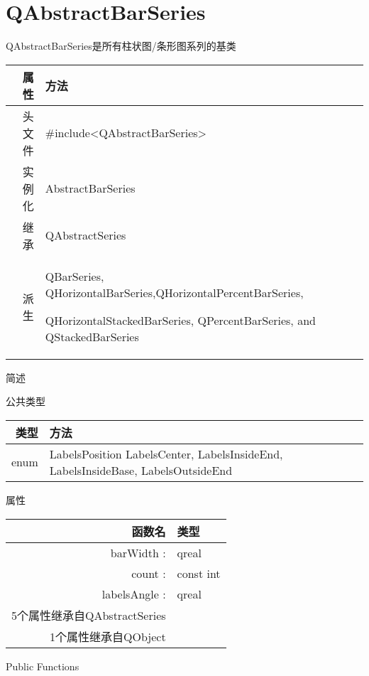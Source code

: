 \chapter{QAbstractBarSeries}

QAbstractBarSeries是所有柱状图/条形图系列的基类

\begin{tabular}{|r|l|}
	\hline
	属性 & 方法 \\
	\hline
	头文件 & \#include<QAbstractBarSeries>\\      
	\hline
	实例化 & AbstractBarSeries\\      
	\hline
	继承&QAbstractSeries \\
	\hline
	派生 & QBarSeries, QHorizontalBarSeries,QHorizontalPercentBarSeries,

 QHorizontalStackedBarSeries, QPercentBarSeries, and QStackedBarSeries \\
	\hline
\end{tabular}

\splitLine

简述

公共类型

\begin{tabular}{|r|l|}
\hline
类型 & 方法 \\
\hline
enum&	LabelsPosition { LabelsCenter, LabelsInsideEnd, LabelsInsideBase, LabelsOutsideEnd }\\
\hline
\end{tabular}

属性

\begin{tabular}{|r|l|}
\hline
函数名 & 类型 \\
\hline
barWidth :	&qreal\\
\hline
count :	&const int\\
\hline
labelsAngle :&qreal\\
\hline
5个属性继承自QAbstractSeries &	\\
\hline
1个属性继承自QObject	&\\
\hline
\end{tabular}

\splitLine

Public Functions

